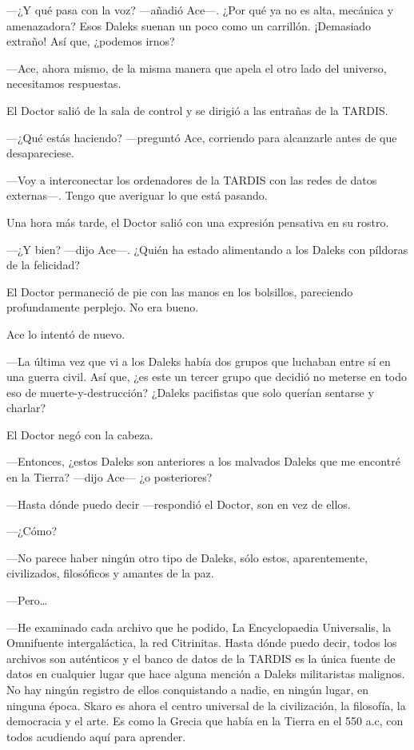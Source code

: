 ---¿Y qué pasa con la voz? ---añadió Ace---. ¿Por qué ya no es
alta, mecánica y amenazadora? Esos Daleks suenan un poco como un
carrillón. ¡Demasiado extraño! Así que, ¿podemos irnos?

---Ace, ahora mismo, de la misma manera que apela el otro lado
del universo, necesitamos respuestas.

El Doctor salió de la sala de control y se dirigió a las
entrañas de la TARDIS.

---¿Qué estás haciendo? ---preguntó Ace, corriendo para
alcanzarle antes de que desapareciese.

---Voy a interconectar los ordenadores de la TARDIS con las
redes de datos externas---. Tengo que averiguar lo que está pasando.

Una hora más tarde, el Doctor salió con una expresión pensativa
en su rostro.

---¿Y bien? ---dijo Ace---. ¿Quién ha estado alimentando a los
Daleks con píldoras de la felicidad?

El Doctor permaneció de pie con las manos en los bolsillos,
pareciendo profundamente perplejo. No era bueno.

Ace lo intentó de nuevo.

---La última vez que vi a los Daleks había dos grupos que
luchaban entre sí en una guerra civil. Así que, ¿es este un tercer grupo
que decidió no meterse en todo eso de muerte-y-destrucción? ¿Daleks
pacifistas que solo querían sentarse y charlar?

El Doctor negó con la cabeza.

---Entonces, ¿estos Daleks son anteriores a los malvados Daleks
que me encontré en la Tierra? ---dijo Ace--- ¿o posteriores?

---Hasta dónde puedo decir ---respondió el Doctor, son en vez de
ellos.

---¿Cómo?

---No parece haber ningún otro tipo de Daleks, sólo estos,
aparentemente, civilizados, filosóficos y amantes de la paz.

---Pero\ldots{}

---He examinado cada archivo que he podido, La Encyclopaedia
Universalis, la Omnifuente intergaláctica, la red Citrinitas. Hasta
dónde puedo decir, todos los archivos son auténticos y el banco de datos
de la TARDIS es la única fuente de datos en cualquier lugar que hace
alguna mención a Daleks militaristas malignos. No hay ningún registro de
ellos conquistando a nadie, en ningún lugar, en ninguna época. Skaro es
ahora el centro universal de la civilización, la filosofía, la
democracia y el arte. Es como la Grecia que había en la Tierra en el 550
a.c, con todos acudiendo aquí para aprender.

